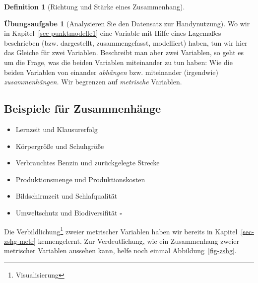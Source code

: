 \documentclass[
  a4paper,
  DIV=11]{scrreprt}
\providecommand{\tightlist}{%
  \setlength{\itemsep}{0pt}\setlength{\parskip}{0pt}}\usepackage{longtable,booktabs,array}
\theoremstyle{definition}
\newtheorem{exercise}{Übungsaufgabe}[chapter]
\theoremstyle{definition}
\theoremstyle{definition}
\newtheorem{definition}{Definition}[chapter]
\theoremstyle{remark}
\begin{document}
\begin{definition}[Richtung und Stärke eines
Zusammenhang]
\begin{exercise}[Analysieren Sie den Datensatz zur
Handynutzung]
Wo wir in Kapitel~\ref{sec-punktmodelle1} eine Variable mit Hilfe eines
Lagemaßes beschrieben (bzw. dargestellt, zusammengefasst, modelliert)
haben, tun wir hier das Gleiche für zwei Variablen. Beschreibt man aber
zwei Variablen, so geht es um die Frage, was die beiden Variablen
miteinander zu tun haben: Wie die beiden Variablen von einander
\emph{abhängen} bzw. miteinander (irgendwie) \emph{zusammenhängen.} Wir
begrenzen auf \emph{metrische} Variablen.

\subsection{Beispiele für
Zusammenhänge}\label{beispiele-fuxfcr-zusammenhuxe4nge}

\begin{itemize}
\tightlist
\item
  Lernzeit und Klausurerfolg
\item
  Körpergröße und Schuhgröße
\item
  Verbrauchtes Benzin und zurückgelegte Strecke
\item
  Produktionsmenge und Produktionskosten
\item
  Bildschirmzeit und Schlafqualität
\item
  Umweltschutz und Biodiversifität \(\square\)
\end{itemize}

Die Verbildlichung\footnote{Visualisierung} zweier metrischer Variablen
haben wir bereits in Kapitel~\ref{sec-zshg-metr} kennengelernt. Zur
Verdeutlichung, wie ein Zusammenhang zweier metrischer Variablen
aussehen kann, helfe noch einmal Abbildung~\ref{fig-zshg}.

\begin{figure}

\begin{minipage}{0.50\linewidth}

\end{minipage}
\end{figure}
\end{exercise}
\end{definition}
\end{document}

